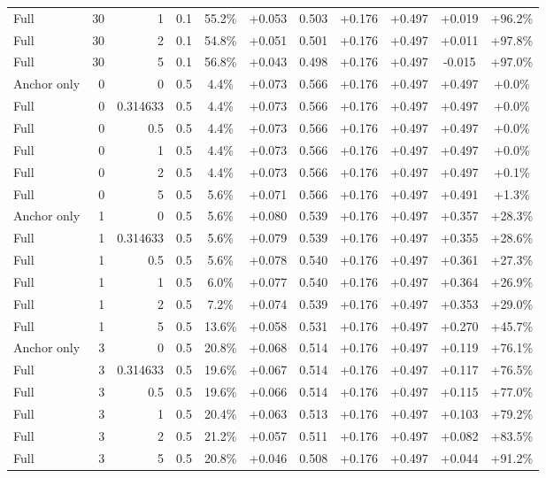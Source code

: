 \begin{table}[htbp]
\begin{tabular}{lrrrccccccc}
Full & 30 & 1 & 0.1 & 55.2\% & +0.053 & 0.503 & +0.176 & +0.497 & +0.019 & +96.2\% \\
Full & 30 & 2 & 0.1 & 54.8\% & +0.051 & 0.501 & +0.176 & +0.497 & +0.011 & +97.8\% \\
Full & 30 & 5 & 0.1 & 56.8\% & +0.043 & 0.498 & +0.176 & +0.497 & -0.015 & +97.0\% \\
Anchor only & 0 & 0 & 0.5 & 4.4\% & +0.073 & 0.566 & +0.176 & +0.497 & +0.497 & +0.0\% \\
Full & 0 & 0.314633 & 0.5 & 4.4\% & +0.073 & 0.566 & +0.176 & +0.497 & +0.497 & +0.0\% \\
Full & 0 & 0.5 & 0.5 & 4.4\% & +0.073 & 0.566 & +0.176 & +0.497 & +0.497 & +0.0\% \\
Full & 0 & 1 & 0.5 & 4.4\% & +0.073 & 0.566 & +0.176 & +0.497 & +0.497 & +0.0\% \\
Full & 0 & 2 & 0.5 & 4.4\% & +0.073 & 0.566 & +0.176 & +0.497 & +0.497 & +0.1\% \\
Full & 0 & 5 & 0.5 & 5.6\% & +0.071 & 0.566 & +0.176 & +0.497 & +0.491 & +1.3\% \\
Anchor only & 1 & 0 & 0.5 & 5.6\% & +0.080 & 0.539 & +0.176 & +0.497 & +0.357 & +28.3\% \\
Full & 1 & 0.314633 & 0.5 & 5.6\% & +0.079 & 0.539 & +0.176 & +0.497 & +0.355 & +28.6\% \\
Full & 1 & 0.5 & 0.5 & 5.6\% & +0.078 & 0.540 & +0.176 & +0.497 & +0.361 & +27.3\% \\
Full & 1 & 1 & 0.5 & 6.0\% & +0.077 & 0.540 & +0.176 & +0.497 & +0.364 & +26.9\% \\
Full & 1 & 2 & 0.5 & 7.2\% & +0.074 & 0.539 & +0.176 & +0.497 & +0.353 & +29.0\% \\
Full & 1 & 5 & 0.5 & 13.6\% & +0.058 & 0.531 & +0.176 & +0.497 & +0.270 & +45.7\% \\
Anchor only & 3 & 0 & 0.5 & 20.8\% & +0.068 & 0.514 & +0.176 & +0.497 & +0.119 & +76.1\% \\
Full & 3 & 0.314633 & 0.5 & 19.6\% & +0.067 & 0.514 & +0.176 & +0.497 & +0.117 & +76.5\% \\
Full & 3 & 0.5 & 0.5 & 19.6\% & +0.066 & 0.514 & +0.176 & +0.497 & +0.115 & +77.0\% \\
Full & 3 & 1 & 0.5 & 20.4\% & +0.063 & 0.513 & +0.176 & +0.497 & +0.103 & +79.2\% \\
Full & 3 & 2 & 0.5 & 21.2\% & +0.057 & 0.511 & +0.176 & +0.497 & +0.082 & +83.5\% \\
Full & 3 & 5 & 0.5 & 20.8\% & +0.046 & 0.508 & +0.176 & +0.497 & +0.044 & +91.2\% \\

\end{tabular}
\end{table}
